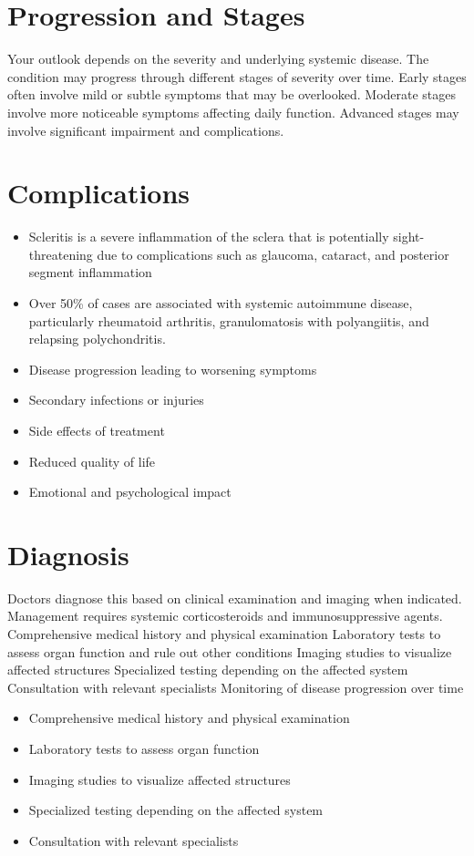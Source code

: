 \section{Progression and Stages}
Your outlook depends on the severity and underlying systemic disease. The condition may progress through different stages of severity over time. Early stages often involve mild or subtle symptoms that may be overlooked. Moderate stages involve more noticeable symptoms affecting daily function. Advanced stages may involve significant impairment and complications.
\section{Complications}
\begin{itemize}[noitemsep]
  \item Scleritis is a severe inflammation of the sclera that is potentially sight-threatening due to complications such as glaucoma, cataract, and posterior segment inflammation
  \item Over 50\% of cases are associated with systemic autoimmune disease, particularly rheumatoid arthritis, granulomatosis with polyangiitis, and relapsing polychondritis.
  \item Disease progression leading to worsening symptoms
  \item Secondary infections or injuries
  \item Side effects of treatment
  \item Reduced quality of life
  \item Emotional and psychological impact
\end{itemize}
\section{Diagnosis}
Doctors diagnose this based on clinical examination and imaging when indicated. Management requires systemic corticosteroids and immunosuppressive agents. Comprehensive medical history and physical examination Laboratory tests to assess organ function and rule out other conditions Imaging studies to visualize affected structures Specialized testing depending on the affected system Consultation with relevant specialists Monitoring of disease progression over time

\begin{itemize}[noitemsep]
  \item Comprehensive medical history and physical examination
  \item Laboratory tests to assess organ function
  \item Imaging studies to visualize affected structures
  \item Specialized testing depending on the affected system
  \item Consultation with relevant specialists
\end{itemize}
